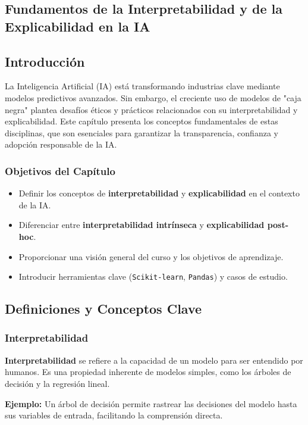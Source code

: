 \begin{refsection}
\chapter{Fundamentos de la Interpretabilidad y de la Explicabilidad en la IA}
\label{chapter:chapter-1}

\section{Introducción}
La Inteligencia Artificial (IA) está transformando industrias clave mediante modelos predictivos avanzados. Sin embargo, el creciente uso de modelos de "caja negra" plantea desafíos éticos y prácticos relacionados con su interpretabilidad y explicabilidad. Este capítulo presenta los conceptos fundamentales de estas disciplinas, que son esenciales para garantizar la transparencia, confianza y adopción responsable de la IA.

\subsection{Objetivos del Capítulo}
\begin{itemize}
    \item Definir los conceptos de \textbf{interpretabilidad} y \textbf{explicabilidad} en el contexto de la IA.
    \item Diferenciar entre \textbf{interpretabilidad intrínseca} y \textbf{explicabilidad post-hoc}.
    \item Proporcionar una visión general del curso y los objetivos de aprendizaje.
    \item Introducir herramientas clave (\texttt{Scikit-learn}, \texttt{Pandas}) y casos de estudio.
\end{itemize}

\section{Definiciones y Conceptos Clave}
\subsection{Interpretabilidad}
\textbf{Interpretabilidad} se refiere a la capacidad de un modelo para ser entendido por humanos. Es una propiedad inherente de modelos simples, como los árboles de decisión y la regresión lineal. 

\textbf{Ejemplo:} Un árbol de decisión permite rastrear las decisiones del modelo hasta sus variables de entrada, facilitando la comprensión directa.


\end{refsection}

